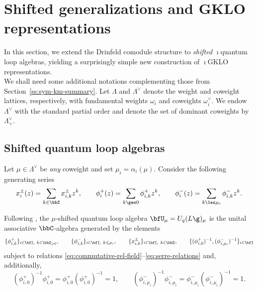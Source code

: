 \documentclass[reqno]{amsart}
\numberwithin{equation}{section}
\begin{document}
\section{Shifted generalizations and GKLO representations}\label{s:shifted-generalizations}
\newcommand{\DDs}{\underset{s}{\Delta}{}_{\mu_1,\mu_2}}
\newcommand{\diff}{\mathcal{A}}
\newcommand{\sw}{\mathsf{w}}
\newcommand{\sz}{\mathsf{z}}
\newcommand{\arxiv}[1]{\href{http://arxiv.org/abs/#1}{\tt arXiv:\nolinkurl{#1}}}

In this section, we extend the Drinfeld comodule structure to \emph{shifted} 
$\imath$quantum  loop algebras,
yielding a surprisingly simple new construction of $\imath$GKLO representations.\\ 

We shall need some additional notations complementing those from
Section~\ref{ss:sym-km-summary}. 
Let $\Lambda$ and $\Lambda^\vee$ denote the weight and coweight lattices, respectively, with fundamental weights $\omega_i$ and coweights $\omega_i^\vee$. We endow $\Lambda^\vee$ with the standard partial order and denote the set of dominant coweights by $\Lambda^\vee_+$. 

\subsection{Shifted quantum loop algebras} 

Let $\mu \in \Lambda^\vee$ be \emph{any} coweight and set $\mu_i = \alpha_i(\mu)$. 
Consider the following generating series 
\[
x_i^{\pm}(z)=\sum_{k\in\bbZ}x_{i,k}^{\pm}z^k,
\qquad
\phi_i^{+}(z)=\sum_{k\ges 0}\phi_{i,k}^{+}z^k,
\qquad
\phi_i^{-}(z)=\sum_{k\les \mu_i}
\phi_{i,k}^{-}z^{k}. 
\] 

Following \cite{FT19}, the $\mu$-shifted quantum loop algebra $\bfU_\mu=U_q(L\g)_\mu$ is the unital associative $\bbC$-algebra generated by the elements
\[
\{\phi^+_{i, k}\}_{i\in\bfI,\ k\in\bbZ_{\geqslant0}},
\qquad
\{\phi^-_{i,k}\}_{i\in\bfI,\ k \leqslant \mu_i},
\qquad
\{x^\pm_{i,k}\}_{i\in\bfI,\ k\in\bbZ},
\qquad
\{ (\phi_{i, 0}^+)^{-1}, (\phi_{i, \mu_i}^-)^{-1}   \}_{i\in\bfI}
\]
subject to relations \eqref{eq:commutative-rel-field}--\eqref{eq:serre-relations} and, additionally, 
\[
(\phi_{i,0}^+)^{-1}\phi_{i,0}^+ = \phi_{i,0}^+(\phi_{i,0}^+)^{-1}=1, \qquad 
(\phi_{i,\mu_i}^-)^{-1}\phi_{i,\mu_i}^- = \phi_{i,\mu_i}^-(\phi_{i,\mu_i}^-)^{-1}=1. 
\]
\end{document}
